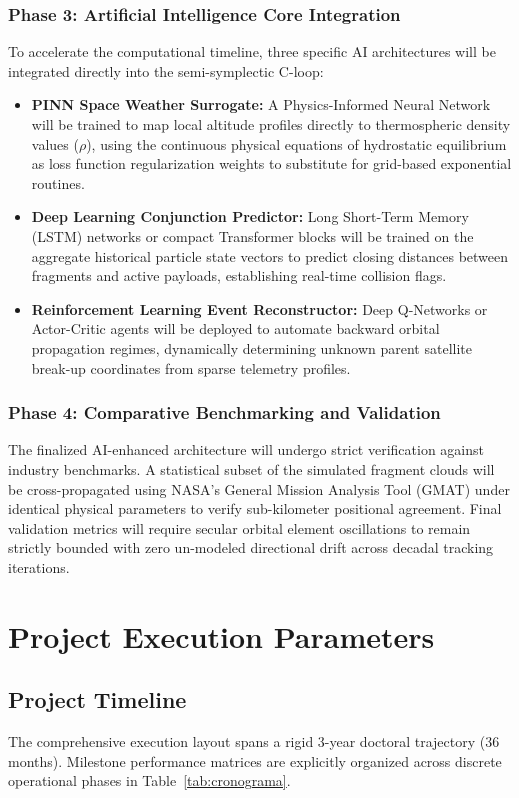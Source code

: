 \documentclass[11pt,letterpaper]{article}
\begin{document}
\subsubsection*{Phase 3: Artificial Intelligence Core Integration}
To accelerate the computational timeline, three specific AI architectures will be integrated directly into the semi-symplectic C-loop:
\begin{itemize}
    \item \textbf{PINN Space Weather Surrogate:} A Physics-Informed Neural Network will be trained to map local altitude profiles directly to thermospheric density values ($\rho$), using the continuous physical equations of hydrostatic equilibrium as loss function regularization weights to substitute for grid-based exponential routines.
    \item \textbf{Deep Learning Conjunction Predictor:} Long Short-Term Memory (LSTM) networks or compact Transformer blocks will be trained on the aggregate historical particle state vectors to predict closing distances between fragments and active payloads, establishing real-time collision flags.
    \item \textbf{Reinforcement Learning Event Reconstructor:} Deep Q-Networks or Actor-Critic agents will be deployed to automate backward orbital propagation regimes, dynamically determining unknown parent satellite break-up coordinates from sparse telemetry profiles.
\end{itemize}

\subsubsection*{Phase 4: Comparative Benchmarking and Validation}
The finalized AI-enhanced architecture will undergo strict verification against industry benchmarks. A statistical subset of the simulated fragment clouds will be cross-propagated using NASA's General Mission Analysis Tool (GMAT) under identical physical parameters to verify sub-kilometer positional agreement. Final validation metrics will require secular orbital element oscillations to remain strictly bounded with zero un-modeled directional drift across decadal tracking iterations.


\section{Project Execution Parameters}

\subsection{Project Timeline}
The comprehensive execution layout spans a rigid 3-year doctoral trajectory (36 months). Milestone performance matrices are explicitly organized across discrete operational phases in Table~\ref{tab:cronograma}.
\end{document}
